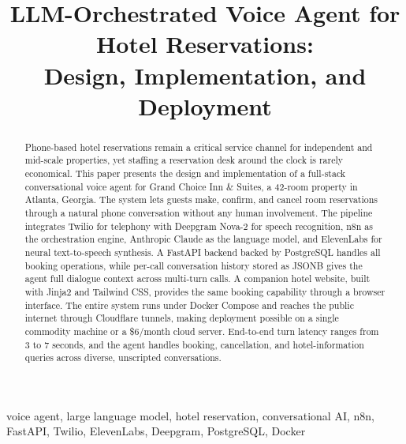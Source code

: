 \documentclass[conference]{IEEEtran}
\begin{document}
\title{LLM-Orchestrated Voice Agent for Hotel Reservations:\\
Design, Implementation, and Deployment}

\author{
}

\maketitle

\begin{abstract}
Phone-based hotel reservations remain a critical service channel for independent
and mid-scale properties, yet staffing a reservation desk around the clock is
rarely economical. This paper presents the design and implementation of a
full-stack conversational voice agent for Grand Choice Inn \& Suites, a
42-room property in Atlanta, Georgia. The system lets guests make, confirm, and
cancel room reservations through a natural phone conversation without any
human involvement. The pipeline integrates Twilio for telephony with Deepgram
Nova-2 for speech recognition, n8n as the orchestration engine, Anthropic Claude
as the language model, and ElevenLabs for neural text-to-speech synthesis. A
FastAPI backend backed by PostgreSQL handles all booking operations, while
per-call conversation history stored as JSONB gives the agent full dialogue
context across multi-turn calls. A companion hotel website, built with Jinja2
and Tailwind CSS, provides the same booking capability through a browser
interface. The entire system runs under Docker Compose and reaches the public
internet through Cloudflare tunnels, making deployment possible on a single
commodity machine or a \$6/month cloud server. End-to-end turn latency ranges
from 3 to 7 seconds, and the agent handles booking, cancellation, and
hotel-information queries across diverse, unscripted conversations.
\end{abstract}

\begin{IEEEkeywords}
voice agent, large language model, hotel reservation, conversational AI,
n8n, FastAPI, Twilio, ElevenLabs, Deepgram, PostgreSQL, Docker
\end{IEEEkeywords}


\end{document}
